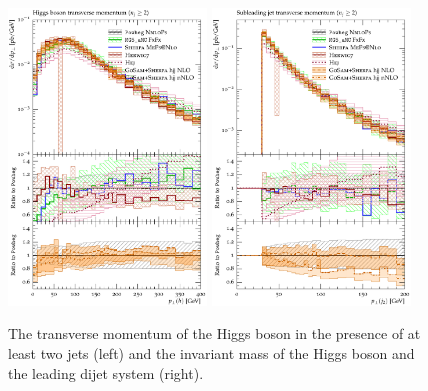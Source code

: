 \begin{figure}[t!]
  \centering
  \includegraphics[width=0.47\textwidth]{figures/hjetscomp_H_jj_pT_incl.pdf}
  \quad
  \includegraphics[width=0.47\textwidth]{figures/hjetscomp_jet2_pT_incl.pdf}
  \caption{
    The transverse momentum of the Higgs boson in the 
    presence of at least two jets (left) and the invariant mass of the 
    Higgs boson and the leading dijet system (right).
    \label{fig:higgscomp:results:2obs:hpt_j2pt}
  }
\end{figure}

